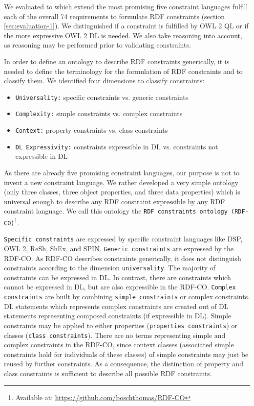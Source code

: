 \documentclass{llncs}
\newcommand{\ms}[1]{\texttt{#1}}
\begin{document}
We evaluated to which extend the most promising five constraint languages fulfill each of the overall 74 requirements to formulate RDF constraints (section \ref{sec:evaluation-1}).
We distinguished if a constraint is fulfilled by OWL 2 QL or if the more expressive OWL 2 DL is needed. 
We also take reasoning into account, as reasoning may be performed prior to validating constraints.

In order to define an ontology to describe RDF constraints generically, it is needed to define the terminology for the formulation of RDF constraints and to classify them. 
We identified four dimensions to classify constraints:
\begin{itemize}
  \item \ms{Universality:} specific constraints vs. generic constraints
	\item \ms{Complexity:} simple constraints vs. complex constraints
	\item \ms{Context:} property constraints vs. class constraints
	\item \ms{DL Expressivity:} constraints expressible in DL vs. constraints not expressible in DL
\end{itemize}

As there are already five promising constraint languages, our purpose is not to invent a new constraint language.
We rather developed a very simple ontology (only three classes, three object properties, and three data properties) which is universal enough to describe any RDF constraint expressible by any RDF constraint language.
We call this ontology the \ms{RDF constraints ontology (RDF-CO)}\footnote{Available at: \url{https://github.com/boschthomas/RDF-CO}}.

\ms{Specific constraints} are expressed by specific constraint languages like DSP, OWL 2, ReSh, ShEx, and SPIN.
\ms{Generic constraints} are expressed by the RDF-CO.
As RDF-CO describes constraints generically, it does not distinguish constraints according to the dimension \ms{universality}. 
The majority of constraints can be expressed in DL.
In contrast, there are constraints which cannot be expressed in DL, but are also expressible in the RDF-CO. 
\ms{Complex constraints} are built by combining \ms{simple constraints} or complex constraints.
DL statements which represents complex constraints are created out of DL statements representing composed constraints (if expressible in DL). 
Simple constraints may be applied to either properties (\ms{properties constraints}) or classes (\ms{class constraints}).
There are no terms representing simple and complex constraints in the RDF-CO, since context classes (associated simple constraints hold for individuals of these classes) of simple constraints may just be reused by further constraints.
As a consequence, the distinction of property and class constraints is sufficient to describe all possible RDF constraints.
\end{document}
